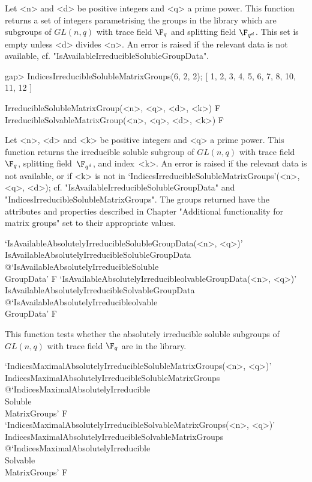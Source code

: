 Let <n> and  <d> be positive integers and <q> a prime power. This
function returns a set of integers parametrising the groups in the {\IRREDSOL} library
which are subgroups of $GL(n,q)$ with trace field $\F_q$
and splitting field $\F_{q^d}$. This set is empty unless <d> divides <n>. An error is 
raised if the relevant data is not available, cf. "IsAvailableIrreducibleSolubleGroupData".


\beginexample
gap> IndicesIrreducibleSolubleMatrixGroups(6, 2, 2);
[ 1, 2, 3, 4, 5, 6, 7, 8, 10, 11, 12 ]
\endexample

\>IrreducibleSolubleMatrixGroup(<n>, <q>, <d>, <k>) F
\>IrreducibleSolvableMatrixGroup(<n>, <q>, <d>, <k>) F

Let <n>, <d> and <k> be  positive integers and <q> a prime power. This
function returns the irreducible soluble subgroup of $GL(n,q)$ with trace field $\F_q$, 
splitting field~$\F_{q^d}$, and index~<k>.
An error is raised if the relevant
data is not available, or if <k> is not in  
`IndicesIrreducibleSolubleMatrixGroups'(<n>, <q>, <d>); cf. "IsAvailableIrreducibleSolubleGroupData" and "IndicesIrreducibleSolubleMatrixGroups".
The groups returned have the attributes and properties described in
Chapter "Additional functionality for matrix groups" set to their appropriate values.


\>`IsAvailableAbsolutelyIrreducibleSolubleGroupData(<n>, <q>)'%
{IsAvailableAbsolutelyIrreducibleSolubleGroupData}%
@{`IsAvailableAbsolutelyIrreducibleSoluble\\GroupData'} F
\>`IsAvailableAbsolutelyIrreducibleolvableGroupData(<n>, <q>)'%
{IsAvailableAbsolutelyIrreducibleSolvableGroupData}%
@{`IsAvailableAbsolutelyIrreducibleolvable\\GroupData'} F

This function tests whether the
absolutely irreducible soluble subgroups of $GL(n,q)$ with trace field $\F_q$ are in the {\IRREDSOL} library.




\>`IndicesMaximalAbsolutelyIrreducibleSolubleMatrixGroups(<n>, <q>)'%
{IndicesMaximalAbsolutelyIrreducibleSolubleMatrixGroups}%
@{`IndicesMaximalAbsolutelyIrreducible\\Soluble\\MatrixGroups'} F
\>`IndicesMaximalAbsolutelyIrreducibleSolvableMatrixGroups(<n>, <q>)'%
{IndicesMaximalAbsolutelyIrreducibleSolvableMatrixGroups}%
@{`IndicesMaximalAbsolutelyIrreducible\\Solvable\\MatrixGroups'} F

